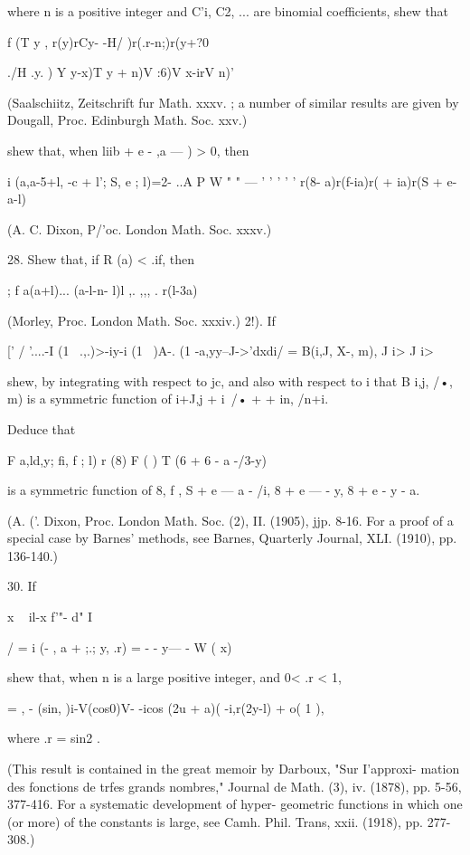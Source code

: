 where n is a positive integer and C'i, C2, ... are binomial
coefficients, shew that

f (T y , r(y)rCy- -H/ )r(.r-n;)r(y+?0

./H .y. ) Y y-x)T y + n)V :6)V x-irV n)'

(Saalschiitz, Zeitschrift fur Math. xxxv. ; a number of similar
results are given by Dougall, Proc. Edinburgh Math. Soc. xxv.)

shew that, when liib + e - ,a — ) > 0, then

i (a,a-5+l, -c + l'; S, e ; l)=2- ..A P W " " — ' ' ' ' ' r(8-
a)r(f-ia)r( + ia)r(S + e-a-l)

(A. C. Dixon, P/'oc. London Math. Soc. xxxv.)

28. Shew that, if R (a) < .if, then

; f a(a+l)... (a-l-n- l)l ,. ,,, . r(l-3a)

(Morley, Proc. London Math. Soc. xxxiv.) 2!). If

[' / '....-I (1 \ .,.)>-iy-i (1 \ )A-. (1 -a,yy--J->'dxdi/ = B(i,J,
X-, m), J i> J i>

shew, by integrating with respect to jc, and also with respect to i
that B i,j, /•, m) is a symmetric function of i+J,j + i\ /• + + in,
/n+i.

Deduce that

F a,ld,y; fi, f ; l) r (8) F ( ) T (6 + 6 - a -/3-y)

is a symmetric function of 8, f , S + e — a - /i, 8 + e — - y, 8 + e -
y - a.

(A. ('. Dixon, Proc. London Math. Soc. (2), II. (1905), jjp. 8-16. For
a proof of a special case by Barnes' methods, see Barnes, Quarterly
Journal, XLI. (1910), pp. 136-140.)

30. If

x ~ il-x f'"- d" I

/ = i (- , a + ;.; y, .r) = - - y— - W ( x) \

shew that, when n is a large positive integer, and 0< .r < 1,

  = , - (sin, )i-V(cos0)V- -icos (2u + a)( -i,r(2y-l) + o( 1 ),

where .r = sin2 .

(This result is contained in the great memoir by Darboux, "Sur
I'approxi- mation des fonctions de trfes grands nombres," Journal de
Math. (3), iv. (1878), pp. 5-56, 377-416. For a systematic development
of hyper- geometric functions in which one (or more) of the constants
is large, see Camh. Phil. Trans, xxii. (1918), pp. 277-308.)


